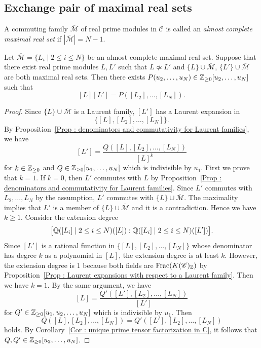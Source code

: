 \subsection{Exchange pair of maximal real sets}
\label{ssec : exchange pairs of maximal real sets}

\begin{Def}
\label{Def : almost complete maximal real sets}
A commuting family $\overline{\mathcal M}$ of real prime modules in
$\mathscr{C}$ is called an \emph{almost complete maximal real set} if
$|\overline{\mathcal M}| = N - 1$.
\end{Def}

\begin{Lem}
\label{Lem : exchange polynomial for maximal real sets}
Let $\overline{\mathcal M} = \{L_i \mid 2 \leq i \leq N\}$ be an almost
complete maximal real set.
Suppose that there exist real prime modules $L, L'$ such that
$L \not\simeq L'$ and $\{L\} \cup \overline{\mathcal M}$,
$\{L'\} \cup \overline{\mathcal M}$ are both maximal real sets.
Then there exists
$P(u_2, \ldots, u_N) \in \mathbb{Z}_{\geq 0}[u_2, \ldots, u_N]$ such that
\[
[L][L'] = P([L_2], \ldots, [L_N]).
\]
\end{Lem}

\begin{proof}
Since $\{L\} \cup \overline{\mathcal M}$ is a Laurent family,
$[L']$ has a Laurent expansion in
\[
\{[L], [L_2], \ldots, [L_N]\}.
\]
By Proposition~\ref{Prop : denominators and commutativity for Laurent families},
we have
\[
[L'] = \frac{Q([L], [L_2], \ldots, [L_N])}{[L]^k}
\]
for $k \in \mathbb{Z}_{\geq 0}$ and $Q \in \mathbb{Z}_{\geq 0}[u_1, \ldots, u_N]$
which is indivisible by $u_1$.
First we prove that $k = 1$.
If $k = 0$, then $L'$ commutes with $L$ by
Proposition~\ref{Prop : denominators and commutativity for Laurent families}.
Since $L'$ commutes with $L_2, \ldots, L_N$ by the assumption,
$L'$ commutes with $\{L\} \cup \overline{\mathcal M}$.
The maximality implies that $L'$ is a member of
$\{L\} \cup \overline{\mathcal M}$ and it is a contradiction.
Hence we have $k \geq 1$.
Consider the extension degree
\[
\bigl[\mathbb{Q}([L_i] \mid 2 \leq i \leq N)([L]) :
\mathbb{Q}([L_i] \mid 2 \leq i \leq N)([L'])\bigr].
\]
Since $[L']$ is a rational function in $\{[L], [L_2], \ldots, [L_N]\}$
whose denominator has degree $k$ as a polynomial in $[L]$,
the extension degree is at least $k$.
However, the extension degree is $1$ because both fields are
$\operatorname{Frac}(K(\mathscr{C})_{\mathbb{Z}})$ by
Proposition~\ref{Prop : Laurent expansions with respect to a Laurent family}.
Then we have $k = 1$.
By the same argument, we have
\[
[L] = \frac{Q'([L'], [L_2], \ldots, [L_N])}{[L']}
\]
for $Q' \in \mathbb{Z}_{\geq 0}[u_1, u_2, \ldots, u_N]$
which is indivisible by $u_1$.
Then
\[
Q([L], [L_2], \ldots, [L_N])
= Q'([L'], [L_2], \ldots, [L_N])
\]
holds.
By Corollary~\ref{Cor : unique prime tensor factorization in C},
it follows that $Q, Q' \in \mathbb{Z}_{\geq 0}[u_2, \ldots, u_N]$.
\end{proof}


